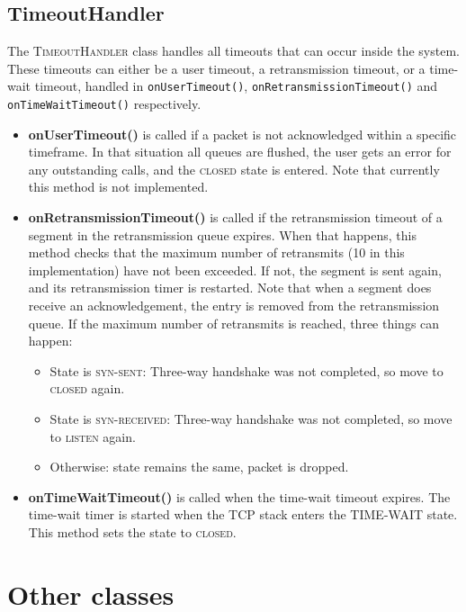 \documentclass{hitec}
\newcommand{\classname}[1]{\textsc{#1}}
\newcommand{\methodname}[1]{\texttt{#1}}
\newcommand{\state}[1]{\textsc{#1}}
\begin{document}
\subsection{TimeoutHandler}
The \classname{TimeoutHandler} class handles all timeouts that can occur inside the system. These timeouts can either be a user timeout, a retransmission timeout, or a time-wait timeout, handled in \methodname{onUserTimeout()}, \methodname{onRetransmissionTimeout()} and \methodname{onTimeWaitTimeout()} respectively.

\begin{itemize}
 \item \textbf{onUserTimeout()} is called if a packet is not acknowledged within a specific timeframe. In that situation all queues are flushed, the user gets an error for any outstanding calls, and the \state{closed} state is entered. Note that currently this method is not implemented.
 
 \item \textbf{onRetransmissionTimeout()} is called if the retransmission timeout of a segment in the retransmission queue expires. When that happens, this method checks that the maximum number of retransmits (10 in this implementation) have not been exceeded. If not, the segment is sent again, and its retransmission timer is restarted. Note that when a segment does receive an acknowledgement, the entry is removed from the retransmission queue. If the maximum number of retransmits is reached, three things can happen:
 
  \begin{itemize}
    \item State is \state{syn-sent}: Three-way handshake was not completed, so move to \state{closed} again.
    \item State is \state{syn-received}: Three-way handshake was not completed, so move to \state{listen} again.
    \item Otherwise: state remains the same, packet is dropped.
  \end{itemize}
 
\item \textbf{onTimeWaitTimeout()} is called when the time-wait timeout expires. The time-wait timer is started when the TCP stack enters the \state{TIME-WAIT} state. This method sets the state to \state{closed}.

\end{itemize}

\section{Other classes}
\end{document}
